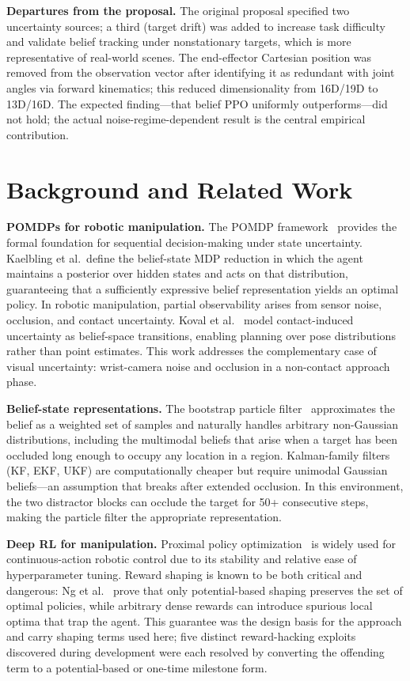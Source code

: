 \documentclass[conference]{IEEEtran}
\begin{document}
\textbf{Departures from the proposal.}
The original proposal specified two uncertainty sources; a third (target
drift) was added to increase task difficulty and validate belief tracking
under nonstationary targets, which is more representative of real-world
scenes.
The end-effector Cartesian position was removed from the observation vector
after identifying it as redundant with joint angles via forward kinematics;
this reduced dimensionality from 16D/19D to 13D/16D.
The expected finding---that belief PPO uniformly outperforms---did not hold;
the actual noise-regime-dependent result is the central empirical
contribution.

\section{Background and Related Work}
\label{sec:background}

\textbf{POMDPs for robotic manipulation.}
The POMDP framework~\cite{kaelbling1998pomdp} provides the formal
foundation for sequential decision-making under state uncertainty.
Kaelbling et al.\ define the belief-state MDP reduction in which the
agent maintains a posterior over hidden states and acts on that
distribution, guaranteeing that a sufficiently expressive belief
representation yields an optimal policy.
In robotic manipulation, partial observability arises from sensor noise,
occlusion, and contact uncertainty.
Koval et al.~\cite{koval2015manifold} model contact-induced uncertainty as
belief-space transitions, enabling planning over pose distributions rather
than point estimates.
This work addresses the complementary case of visual uncertainty:
wrist-camera noise and occlusion in a non-contact approach phase.

\textbf{Belief-state representations.}
The bootstrap particle filter~\cite{gordon1993novel} approximates the
belief as a weighted set of samples and naturally handles arbitrary
non-Gaussian distributions, including the multimodal beliefs that arise
when a target has been occluded long enough to occupy any location in a
region.
Kalman-family filters (KF, EKF, UKF) are computationally cheaper but
require unimodal Gaussian beliefs---an assumption that breaks after
extended occlusion.
In this environment, the two distractor blocks can occlude the target
for 50+ consecutive steps, making the particle filter the appropriate
representation.

\textbf{Deep RL for manipulation.}
Proximal policy optimization~\cite{schulman2017ppo} is widely used for
continuous-action robotic control due to its stability and relative ease
of hyperparameter tuning.
Reward shaping is known to be both critical and dangerous: Ng
et al.~\cite{ng1999potential} prove that only potential-based shaping
preserves the set of optimal policies, while arbitrary dense rewards can
introduce spurious local optima that trap the agent.
This guarantee was the design basis for the approach and carry shaping
terms used here; five distinct reward-hacking exploits discovered during
development were each resolved by converting the offending term to a
potential-based or one-time milestone form.
\end{document}
